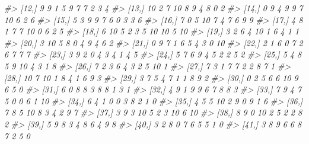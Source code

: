 \documentclass[
]{book}
\newenvironment{Shaded}{\begin{snugshade}}{\end{snugshade}}
\newcommand{\CommentTok}[1]{\textcolor[rgb]{0.56,0.35,0.01}{\textit{#1}}}
\begin{document}
\begin{Shaded}
\begin{Highlighting}[]
\CommentTok{\#\textgreater{}  [12,]    9    9    1    5    9    7    7    2    3     4}
\CommentTok{\#\textgreater{}  [13,]   10    2    7   10    8    9    4    8    0     2}
\CommentTok{\#\textgreater{}  [14,]    0    9    4    9    9    7   10    6    2     6}
\CommentTok{\#\textgreater{}  [15,]    5    3    9    9    7    6    0    3    3     6}
\CommentTok{\#\textgreater{}  [16,]    7    0    5   10    7    4    7    6    9     9}
\CommentTok{\#\textgreater{}  [17,]    4    8    1    7    7   10    0    6    2     5}
\CommentTok{\#\textgreater{}  [18,]    6   10    5    2    3    5   10   10    5    10}
\CommentTok{\#\textgreater{}  [19,]    3    2    6    4   10    1    6    4    1     1}
\CommentTok{\#\textgreater{}  [20,]    3   10    5    8    0    4    9    4    6     2}
\CommentTok{\#\textgreater{}  [21,]    0    9    7    1    6    5    4    3    0    10}
\CommentTok{\#\textgreater{}  [22,]    2    1    6    0    7    2    6    7    7     7}
\CommentTok{\#\textgreater{}  [23,]    3    9    2    0    4    3    4    1    4     5}
\CommentTok{\#\textgreater{}  [24,]    5    7    6    9    4    5    2    2    5     2}
\CommentTok{\#\textgreater{}  [25,]    5    4    8    5    9   10    4    3    1     8}
\CommentTok{\#\textgreater{}  [26,]    7    2    3    6    4    3    2    5   10     1}
\CommentTok{\#\textgreater{}  [27,]    7    3    1    7    7    2    2    8    7     1}
\CommentTok{\#\textgreater{}  [28,]   10    7   10    1    8    4    1    6    9     3}
\CommentTok{\#\textgreater{}  [29,]    3    7    5    4    7    1    1    8    9     2}
\CommentTok{\#\textgreater{}  [30,]    0    2    5    6    6   10    9    6    5     0}
\CommentTok{\#\textgreater{}  [31,]    6    0    8    8    3    8    8    1    3     1}
\CommentTok{\#\textgreater{}  [32,]    4    9    1    9    9    6    7    8    8     3}
\CommentTok{\#\textgreater{}  [33,]    7    9    4    7    5    0    0    6    1    10}
\CommentTok{\#\textgreater{}  [34,]    6    4    1    0    0    3    8    2    1     0}
\CommentTok{\#\textgreater{}  [35,]    4    5    5   10    2    9    0    9    1     6}
\CommentTok{\#\textgreater{}  [36,]    7    8    5   10    8    3    4    2    9     7}
\CommentTok{\#\textgreater{}  [37,]    3    9    3   10    5    2    3   10    6    10}
\CommentTok{\#\textgreater{}  [38,]    8    9    0   10    2    5    2    2    8     2}
\CommentTok{\#\textgreater{}  [39,]    5    9    8    3    4    8    6    4    9     8}
\CommentTok{\#\textgreater{}  [40,]    3    2    8    0    7    6    5    5    1     0}
\CommentTok{\#\textgreater{}  [41,]    3    8    9    6    6    8    7    2    5     0}

\end{Highlighting}
\end{Shaded}
\end{document}
